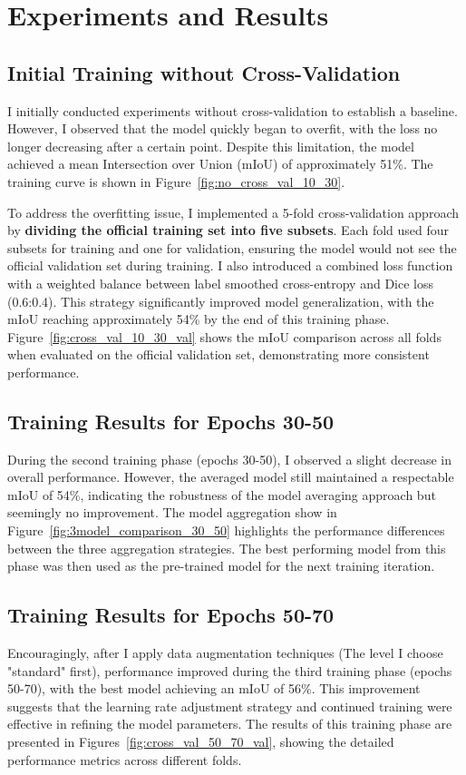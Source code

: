 \documentclass[]{article}
\begin{document}
\section{Experiments and Results}\label{sec:Experiments}
\subsection{Initial Training without Cross-Validation}
I initially conducted experiments without cross-validation to establish a baseline. However, I observed that the model quickly began to overfit, with the loss no longer decreasing after a certain point. Despite this limitation, the model achieved a mean Intersection over Union (mIoU) of approximately 51\%. The training curve is shown in Figure~\ref{fig:no_cross_val_10_30}.

To address the overfitting issue, I implemented a 5-fold cross-validation approach by \textbf{dividing the official training set into five subsets}. Each fold used four subsets for training and one for validation, ensuring the model would not see the official validation set during training. I also introduced a combined loss function with a weighted balance between label smoothed cross-entropy and Dice loss (0.6:0.4). This strategy significantly improved model generalization, with the mIoU reaching approximately 54\% by the end of this training phase. Figure~\ref{fig:cross_val_10_30_val} shows the mIoU comparison across all folds when evaluated on the official validation set, demonstrating more consistent performance.

\subsection{Training Results for Epochs 30-50}
During the second training phase (epochs 30-50), I observed a slight decrease in overall performance. However, the averaged model still maintained a respectable mIoU of 54\%, indicating the robustness of the model averaging approach but seemingly no improvement. The model aggregation show in Figure~\ref{fig:3model_comparison_30_50} highlights the performance differences between the three aggregation strategies. The best performing model from this phase was then used as the pre-trained model for the next training iteration.


\subsection{Training Results for Epochs 50-70}
Encouragingly, after I apply data augmentation techniques (The level I choose "standard" first), performance improved during the third training phase (epochs 50-70), with the best model achieving an mIoU of 56\%. This improvement suggests that the learning rate adjustment strategy and continued training were effective in refining the model parameters. The results of this training phase are presented in Figures~\ref{fig:cross_val_50_70_val}, showing the detailed performance metrics across different folds.
\end{document}
